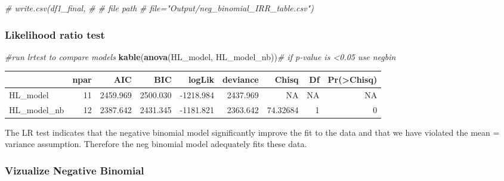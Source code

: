 \documentclass[
]{article}
\newenvironment{Shaded}{\begin{snugshade}}{\end{snugshade}}
\newcommand{\CommentTok}[1]{\textcolor[rgb]{0.56,0.35,0.01}{\textit{#1}}}
\newcommand{\FunctionTok}[1]{\textcolor[rgb]{0.13,0.29,0.53}{\textbf{#1}}}
\newcommand{\NormalTok}[1]{#1}
\begin{document}
\begin{Shaded}
\begin{Highlighting}[]
\CommentTok{\# write.csv(df1\_final,}
\CommentTok{\#        \# file path}
\CommentTok{\#        file="Output/neg\_binomial\_IRR\_table.csv")}
\end{Highlighting}
\end{Shaded}

\hypertarget{likelihood-ratio-test}{%
\subsubsection{Likelihood ratio test}\label{likelihood-ratio-test}}

\begin{Shaded}
\begin{Highlighting}[]
\CommentTok{\#run lrtest to compare models}
\FunctionTok{kable}\NormalTok{(}\FunctionTok{anova}\NormalTok{(HL\_model, HL\_model\_nb))}\CommentTok{\# if p{-}value is \textless{}0.05 use negbin}
\end{Highlighting}
\end{Shaded}

\begin{tabular}{l|r|r|r|r|r|r|r|r}
\hline
  & npar & AIC & BIC & logLik & deviance & Chisq & Df & Pr(>Chisq)\\
\hline
HL\_model & 11 & 2459.969 & 2500.030 & -1218.984 & 2437.969 & NA & NA & NA\\
\hline
HL\_model\_nb & 12 & 2387.642 & 2431.345 & -1181.821 & 2363.642 & 74.32684 & 1 & 0\\
\hline
\end{tabular}

The LR test indicates that the negative binomial model significantly
improve the fit to the data and that we have violated the mean =
variance assumption. Therefore the neg binomial model adequately fits
these data.

\hypertarget{vizualize-negative-binomial}{%
\subsubsection{Vizualize Negative
Binomial}\label{vizualize-negative-binomial}}
\end{document}
